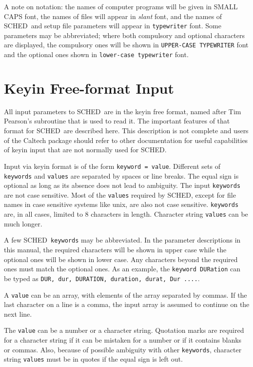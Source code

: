 \documentclass{report}
\newcommand{\sched}{{\sc SCHED}}
\newcommand{\schedb}{{\sc SCHED~}}
\begin{document}
A note on notation: the names of computer programs will be given in
{\sc SMALL CAPS} font, the names of files will appear in {\sl slant}
font, and the names of \schedb and setup file parameters will
appear in {\tt typewriter} font. Some parameters may be abbreviated;
where both compulsory and optional characters are displayed, the
compulsory ones will be shown in {\tt UPPER-CASE TYPEWRITER} font and
the optional ones shown in {\tt lower-case typewriter} font.



\section{\label{SEC:KEYIN}Keyin Free-format Input}

All input parameters to \schedb are in the keyin free format, named
after Tim Pearson's subroutine that is used to read it. The important
features of that format for \schedb are described here. This
description is not complete and users of the Caltech package
should refer to other documentation for useful capabilities of keyin
input that are not normally used for \sched.

Input via keyin format is of the form {\tt keyword = value}. Different
sets of {\tt keywords} and {\tt values} are separated by spaces or line
breaks. The equal sign is optional as long as its absence does not
lead to ambiguity.  The input {\tt keywords} are not case sensitive.
Most of the {\tt values} required by \sched, except for file
names in case sensitive systems like unix, are also not case
sensitive.  {\tt keywords} are, in all cases, limited to 8 characters
in length.  Character string {\tt values} can be much longer.

A few \schedb {\tt keywords} may be abbreviated.  In the parameter
descriptions in this manual, the required characters will be shown in
upper case while the optional ones will be shown in lower case.  Any
characters beyond the required ones must match the optional ones.  As
an example, the {\tt keyword DURation} can be typed as {\tt DUR, dur,
DURATION, duration, durat, Dur ....}.

A {\tt value} can be an array, with elements of the array separated by
commas. If the last character on a line is a comma, the input array is
assumed to continue on the next line.

The {\tt value} can be a number or a character string.  Quotation
marks are required for a character string if it can be mistaken for a
number or if it contains blanks or commas.  Also, because of possible
ambiguity with other {\tt keywords}, character string {\tt values}
must be in quotes if the equal sign is left out.
\end{document}
